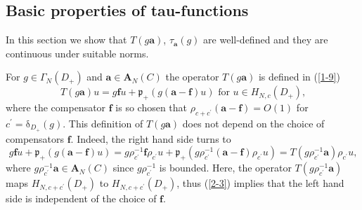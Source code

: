 \documentclass[a4paper]{article}%
\begin{document}
\subsection{Basic properties of tau-functions}

In this section we show that $T\left(  g\boldsymbol{a}\right)  $,
$\tau_{\boldsymbol{a}}\left(  g\right)  $ are well-defined and they are
continuous under suitable norms.

For $g\in\Gamma_{N}\left(  D_{+}\right)  $ and $\boldsymbol{a}\in
\boldsymbol{A}_{N}\left(  C\right)  $ the operator $T\left(  g\boldsymbol{a}%
\right)  $ is defined in (\ref{1-9})%
\[
T\left(  g\boldsymbol{a}\right)  u=g\boldsymbol{f}u+\mathfrak{p}_{+}\left(
g\left(  \boldsymbol{a}-\boldsymbol{f}\right)  u\right)  \text{ \ for }u\in
H_{N,c}\left(  D_{+}\right)  \text{,}%
\]
where the compensator $\boldsymbol{f}$ is so chosen that $\rho_{c+c^{\prime}%
}\left(  \boldsymbol{a}-\boldsymbol{f}\right)  =O\left(  1\right)  $ for
$c^{\prime}=\mathrm{\delta}_{D_{+}}\left(  g\right)  $. This definition of
$T\left(  g\boldsymbol{a}\right)  $ does not depend on the choice of
compensators $\boldsymbol{f}$. Indeed, the right hand side turns to \
\[
g\boldsymbol{f}u+\mathfrak{p}_{+}\left(  g\left(  \boldsymbol{a}%
-\boldsymbol{f}\right)  u\right)  =g\rho_{c^{\prime}}^{-1}\boldsymbol{f}%
\rho_{c^{\prime}}u+\mathfrak{p}_{+}\left(  g\rho_{c^{\prime}}^{-1}\left(
\boldsymbol{a}-\boldsymbol{f}\right)  \rho_{c^{\prime}}u\right)  =T\left(
g\rho_{c^{\prime}}^{-1}\boldsymbol{a}\right)  \rho_{c^{\prime}}u\text{,}%
\]
where $g\rho_{c^{\prime}}^{-1}\boldsymbol{a}\in\boldsymbol{A}_{N}\left(
C\right)  $ since $g\rho_{c^{\prime}}^{-1}$ is bounded. Here, the operator
$T\left(  g\rho_{c^{\prime}}^{-1}\boldsymbol{a}\right)  $ maps
$H_{N,c+c^{\prime}}\left(  D_{+}\right)  $ to $H_{N,c+c^{\prime}}\left(
D_{+}\right)  $, thus (\ref{2-3}) implies that the left hand side is
independent of the choice of $\boldsymbol{f}$.
\end{document}
